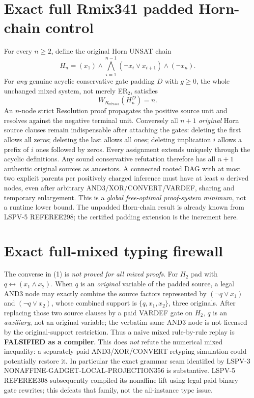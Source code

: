 \documentclass[11pt]{article}
\begin{document}
\section*{Exact full Rmix341 padded Horn-chain control}
For every $n\ge2$, define the original Horn UNSAT chain
\[
H_n=(x_1)\wedge\bigwedge_{i=1}^{n-1}(\neg x_i\vee x_{i+1})\wedge(\neg x_n).
\]
For \emph{any} genuine acyclic conservative gate padding $D$ with $g\ge0$, the whole unchanged mixed system, not merely ER$_2$, satisfies
\[
\boxed{W_{R_{\mathrm{mix341}}}(H_n^D)=n.}\tag{2}
\]
An $n$-node strict Resolution proof propagates the positive source unit and resolves against the negative terminal unit. Conversely all $n+1$ \emph{original} Horn source clauses remain indispensable after attaching the gates: deleting the first allows all zeros; deleting the last allows all ones; deleting implication $i$ allows a prefix of $i$ ones followed by zeros. Every assignment extends uniquely through the acyclic definitions. Any sound conservative refutation therefore has all $n+1$ authentic original sources as ancestors. A connected rooted DAG with at most two explicit parents per positively charged inference must have at least $n$ derived nodes, even after arbitrary AND3/XOR/CONVERT/VARDEF, sharing and temporary enlargement. This is a \emph{global free-optimal proof-system minimum}, not a runtime lower bound. The unpadded Horn-chain result is already known from LSPV-5 REFEREE298; the certified padding extension is the increment here.

\section*{Exact full-mixed typing firewall}
The converse in (1) is \emph{not proved for all mixed proofs}. For $H_2$ pad with $q\leftrightarrow(x_1\wedge x_2)$. When $q$ is an \emph{original} variable of the padded source, a legal AND3 node may exactly combine the source factors represented by $(\neg q\vee x_1)$ and $(\neg q\vee x_2)$, whose combined support is $\{q,x_1,x_2\}$, three originals. After replacing those two source clauses by a paid VARDEF gate on $H_2$, $q$ is an \emph{auxiliary}, not an original variable; the verbatim same AND3 node is not licensed by the original-support restriction. Thus a naive mixed rule-by-rule replay is \textbf{FALSIFIED as a compiler}. This does \emph{not} refute the numerical mixed inequality: a separately paid AND3/XOR/CONVERT retyping simulation could potentially restore it. In particular the exact grammar seam identified by LSPV-3 NONAFFINE-GADGET-LOCAL-PROJECTION356 is substantive. LSPV-5 REFEREE308 subsequently compiled its nonaffine lift using legal paid binary gate rewrites; this defeats that family, not the all-instance type issue.
\end{document}
